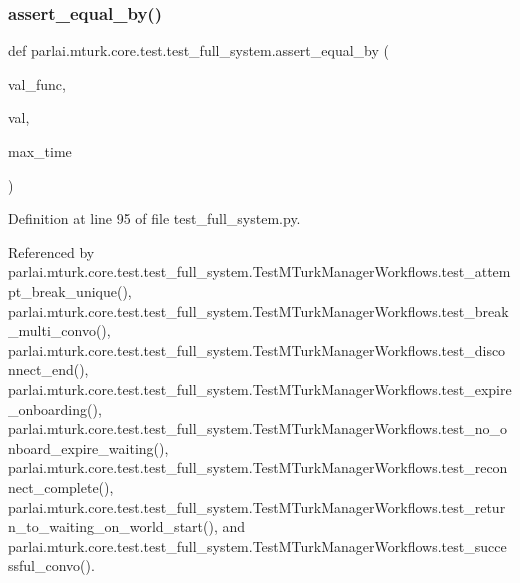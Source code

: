 \subsubsection{\texorpdfstring{assert\+\_\+equal\+\_\+by()}{assert\_equal\_by()}}
{\footnotesize\ttfamily def parlai.\+mturk.\+core.\+test.\+test\+\_\+full\+\_\+system.\+assert\+\_\+equal\+\_\+by (\begin{DoxyParamCaption}\item[{}]{val\+\_\+func,  }\item[{}]{val,  }\item[{}]{max\+\_\+time }\end{DoxyParamCaption})}



Definition at line 95 of file test\+\_\+full\+\_\+system.\+py.



Referenced by parlai.\+mturk.\+core.\+test.\+test\+\_\+full\+\_\+system.\+Test\+M\+Turk\+Manager\+Workflows.\+test\+\_\+attempt\+\_\+break\+\_\+unique(), parlai.\+mturk.\+core.\+test.\+test\+\_\+full\+\_\+system.\+Test\+M\+Turk\+Manager\+Workflows.\+test\+\_\+break\+\_\+multi\+\_\+convo(), parlai.\+mturk.\+core.\+test.\+test\+\_\+full\+\_\+system.\+Test\+M\+Turk\+Manager\+Workflows.\+test\+\_\+disconnect\+\_\+end(), parlai.\+mturk.\+core.\+test.\+test\+\_\+full\+\_\+system.\+Test\+M\+Turk\+Manager\+Workflows.\+test\+\_\+expire\+\_\+onboarding(), parlai.\+mturk.\+core.\+test.\+test\+\_\+full\+\_\+system.\+Test\+M\+Turk\+Manager\+Workflows.\+test\+\_\+no\+\_\+onboard\+\_\+expire\+\_\+waiting(), parlai.\+mturk.\+core.\+test.\+test\+\_\+full\+\_\+system.\+Test\+M\+Turk\+Manager\+Workflows.\+test\+\_\+reconnect\+\_\+complete(), parlai.\+mturk.\+core.\+test.\+test\+\_\+full\+\_\+system.\+Test\+M\+Turk\+Manager\+Workflows.\+test\+\_\+return\+\_\+to\+\_\+waiting\+\_\+on\+\_\+world\+\_\+start(), and parlai.\+mturk.\+core.\+test.\+test\+\_\+full\+\_\+system.\+Test\+M\+Turk\+Manager\+Workflows.\+test\+\_\+successful\+\_\+convo().

